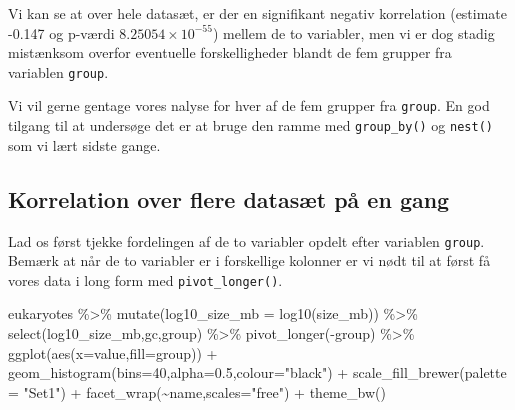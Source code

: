 \documentclass[
]{book}
\newenvironment{Shaded}{\begin{snugshade}}{\end{snugshade}}
\newcommand{\AttributeTok}[1]{\textcolor[rgb]{0.77,0.63,0.00}{#1}}
\newcommand{\DecValTok}[1]{\textcolor[rgb]{0.00,0.00,0.81}{#1}}
\newcommand{\FloatTok}[1]{\textcolor[rgb]{0.00,0.00,0.81}{#1}}
\newcommand{\FunctionTok}[1]{\textcolor[rgb]{0.00,0.00,0.00}{#1}}
\newcommand{\NormalTok}[1]{#1}
\newcommand{\SpecialCharTok}[1]{\textcolor[rgb]{0.00,0.00,0.00}{#1}}
\newcommand{\StringTok}[1]{\textcolor[rgb]{0.31,0.60,0.02}{#1}}
\begin{document}
Vi kan se at over hele datasæt, er der en signifikant negativ korrelation (estimate -0.147 og p-værdi \ensuremath{8.25054\times 10^{-55}}) mellem de to variabler, men vi er dog stadig mistænksom overfor eventuelle forskelligheder blandt de fem grupper fra variablen \texttt{group}.

Vi vil gerne gentage vores nalyse for hver af de fem grupper fra \texttt{group}. En god tilgang til at undersøge det er at bruge den ramme med \texttt{group\_by()} og \texttt{nest()} som vi lært sidste gange.

\hypertarget{korrelation-over-flere-datasuxe6t-puxe5-en-gang}{%
\subsection{Korrelation over flere datasæt på en gang}\label{korrelation-over-flere-datasuxe6t-puxe5-en-gang}}

Lad os først tjekke fordelingen af de to variabler opdelt efter variablen \texttt{group}. Bemærk at når de to variabler er i forskellige kolonner er vi nødt til at først få vores data i long form med \texttt{pivot\_longer()}.

\begin{Shaded}
\begin{Highlighting}[]
\NormalTok{eukaryotes }\SpecialCharTok{\%\textgreater{}\%} 
  \FunctionTok{mutate}\NormalTok{(}\AttributeTok{log10\_size\_mb =} \FunctionTok{log10}\NormalTok{(size\_mb)) }\SpecialCharTok{\%\textgreater{}\%}
  \FunctionTok{select}\NormalTok{(log10\_size\_mb,gc,group) }\SpecialCharTok{\%\textgreater{}\%} 
  \FunctionTok{pivot\_longer}\NormalTok{(}\SpecialCharTok{{-}}\NormalTok{group) }\SpecialCharTok{\%\textgreater{}\%}
  \FunctionTok{ggplot}\NormalTok{(}\FunctionTok{aes}\NormalTok{(}\AttributeTok{x=}\NormalTok{value,}\AttributeTok{fill=}\NormalTok{group)) }\SpecialCharTok{+} 
  \FunctionTok{geom\_histogram}\NormalTok{(}\AttributeTok{bins=}\DecValTok{40}\NormalTok{,}\AttributeTok{alpha=}\FloatTok{0.5}\NormalTok{,}\AttributeTok{colour=}\StringTok{"black"}\NormalTok{) }\SpecialCharTok{+}
  \FunctionTok{scale\_fill\_brewer}\NormalTok{(}\AttributeTok{palette =} \StringTok{"Set1"}\NormalTok{) }\SpecialCharTok{+}
  \FunctionTok{facet\_wrap}\NormalTok{(}\SpecialCharTok{\textasciitilde{}}\NormalTok{name,}\AttributeTok{scales=}\StringTok{"free"}\NormalTok{) }\SpecialCharTok{+}
  \FunctionTok{theme\_bw}\NormalTok{()}
\end{Highlighting}
\end{Shaded}
\end{document}
